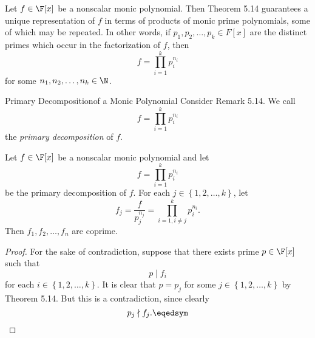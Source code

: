\documentclass[linearalgebra]{subfiles}
\begin{document}
    \begin{remark}
        Let $f\in\F[x]$ be a nonscalar monic polynomial. Then Theorem 5.14 guarantees a unique representation of $f$ in terms of products of monic prime polynomials, some of which may be repeated. In other words, if $p_1,p_2,\ldots,p_k\in F[x]$ are the distinct primes which occur in the factorization of $f$, then
        \begin{equation*}
            f = \prod^{k}_{i=1} p_i^{n_i}
        \end{equation*}
        for some $n_1,n_2,\ldots,n_k\in\N$. 
    \end{remark}

    \begin{definition}{Primary Decomposition}{of a Monic Polynomial}
        Consider Remark 5.14. We call
        \begin{equation*}
            f = \prod^{k}_{i=1} p_i^{n_i}
        \end{equation*}
        the \emph{primary decomposition} of $f$.
    \end{definition}

    \begin{prop}{}
        Let $f\in\F[x]$ be a nonscalar monic polynomial and let
        \begin{equation*}
            f = \prod^{k}_{i=1} p_i^{n_i}
        \end{equation*}
        be the primary decomposition of $f$. For each $j\in\left\lbrace 1,2,\ldots,k \right\rbrace$, let
        \begin{equation*}
            f_j = \frac{f}{p_j^{n_j}} = \prod^{k}_{i=1,i\neq j} p_i^{n_i} .
        \end{equation*}
        Then $f_1,f_2,\ldots,f_n$ are coprime.
    \end{prop}

    \begin{proof}
        For the sake of contradiction, suppose that there exists prime $p\in\F[x]$ such that
        \begin{equation*}
            p\mid f_i
        \end{equation*}
        for each $i\in\left\lbrace 1,2,\ldots,k \right\rbrace$. It is clear that $p=p_j$ for some $j\in\left\lbrace 1,2,\ldots,k \right\rbrace$ by Theorem 5.14. But this is a contradiction, since clearly
        \begin{equation*}
            p_j\nmid f_j. \eqedsym
        \end{equation*}
    \end{proof}
\end{document}
